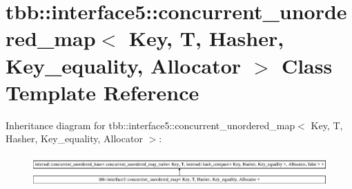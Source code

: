 \hypertarget{classtbb_1_1interface5_1_1concurrent__unordered__map}{}\section{tbb\+:\+:interface5\+:\+:concurrent\+\_\+unordered\+\_\+map$<$ Key, T, Hasher, Key\+\_\+equality, Allocator $>$ Class Template Reference}
\label{classtbb_1_1interface5_1_1concurrent__unordered__map}
Inheritance diagram for tbb\+:\+:interface5\+:\+:concurrent\+\_\+unordered\+\_\+map$<$ Key, T, Hasher, Key\+\_\+equality, Allocator $>$\+:\begin{figure}[H]
\begin{center}
\leavevmode
\includegraphics[height=1.216069cm]{classtbb_1_1interface5_1_1concurrent__unordered__map}
\end{center}
\end{figure}

